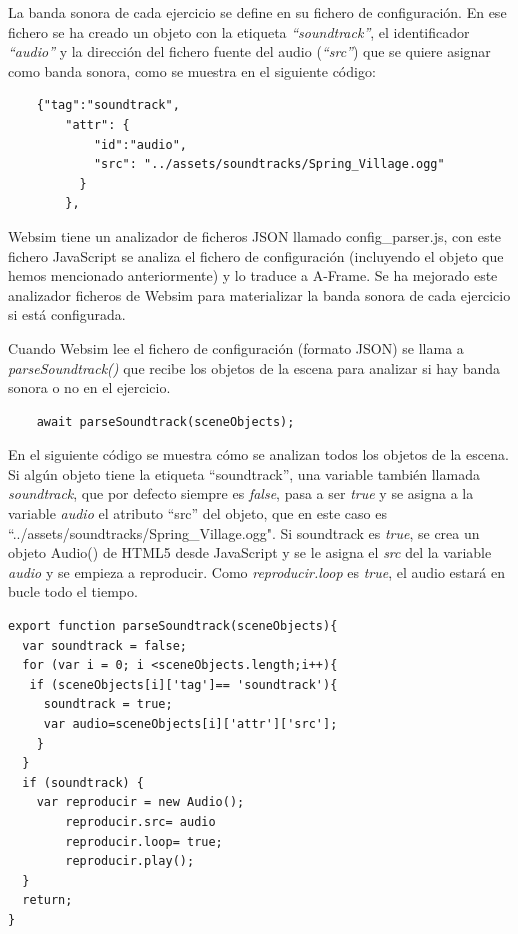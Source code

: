 La banda sonora de cada ejercicio se define en su fichero de configuración. En ese fichero se ha creado un objeto con la etiqueta \textit{``soundtrack''}, el identificador \textit{``audio''} y la dirección del fichero fuente del audio (\textit{``src''}) que se quiere asignar como banda sonora, como se muestra en el siguiente código:

\begin{lstlisting}
 	{"tag":"soundtrack",
        "attr": {
            "id":"audio",
            "src": "../assets/soundtracks/Spring_Village.ogg"
          }
        },
   \end{lstlisting}

Websim tiene un analizador de ficheros JSON llamado config\_parser.js, con este fichero JavaScript se analiza el fichero de configuración (incluyendo el objeto que hemos mencionado anteriormente) y lo traduce a A-Frame. Se ha mejorado este analizador ficheros de Websim para materializar la banda sonora de cada ejercicio si está configurada.

Cuando Websim lee el fichero de configuración (formato JSON) se llama a \textit{parseSoundtrack()} que recibe los objetos de la escena para analizar si hay banda sonora o no en el ejercicio.

\begin{lstlisting}
 	await parseSoundtrack(sceneObjects);
\end{lstlisting}

En el siguiente código se muestra cómo se analizan todos los objetos de la escena. Si algún objeto tiene la etiqueta ``soundtrack'', una variable también llamada \textit{soundtrack}, que por defecto siempre es \textit{false}, pasa a ser \textit{true} y se asigna a la variable \textit{audio} el atributo  ``src'' del objeto,  que en este caso es  ``../assets/soundtracks/Spring\_Village.ogg".  
Si soundtrack es \textit{true}, se crea un objeto Audio() de HTML5 desde JavaScript y se le asigna el \textit{src} del la variable \textit{audio} y se empieza a reproducir. Como \textit{reproducir.loop} es \textit{true}, el audio estará en bucle todo el tiempo.

\begin{lstlisting}
export function parseSoundtrack(sceneObjects){
  var soundtrack = false;
  for (var i = 0; i <sceneObjects.length;i++){
   if (sceneObjects[i]['tag']== 'soundtrack'){
     soundtrack = true;
     var audio=sceneObjects[i]['attr']['src'];
    }
  }
  if (soundtrack) {
    var reproducir = new Audio();
        reproducir.src= audio
        reproducir.loop= true;
        reproducir.play();
  }
  return;
}
\end{lstlisting}

